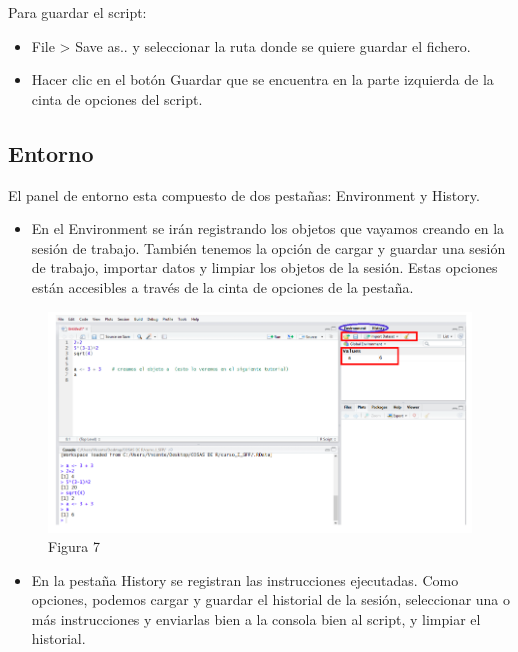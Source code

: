 \documentclass[
]{book}
\providecommand{\tightlist}{%
  \setlength{\itemsep}{0pt}\setlength{\parskip}{0pt}}
\begin{document}
Para guardar el script:

\begin{itemize}
\item
  File \textgreater{} Save as.. y seleccionar la ruta donde se quiere guardar el fichero.
\item
  Hacer clic en el botón Guardar que se encuentra en la parte izquierda de la cinta de opciones del script.
\end{itemize}

\hypertarget{entorno}{%
\subsection{Entorno}\label{entorno}}

El panel de entorno esta compuesto de dos pestañas: Environment y History.

\begin{itemize}
\tightlist
\item
  En el Environment se irán registrando los objetos que vayamos creando en la sesión de trabajo. También tenemos la opción de cargar y guardar una sesión de trabajo, importar datos y limpiar los objetos de la sesión. Estas opciones están accesibles a través de la cinta de opciones de la pestaña.
\end{itemize}

\begin{figure}
\centering
\includegraphics{imagenes/08.png}
\caption{Figura 7}
\end{figure}

\begin{itemize}
\tightlist
\item
  En la pestaña History se registran las instrucciones ejecutadas. Como opciones, podemos cargar y guardar el historial de la sesión, seleccionar una o más instrucciones y enviarlas bien a la consola bien al script, y limpiar el historial.
\end{itemize}
\end{document}
